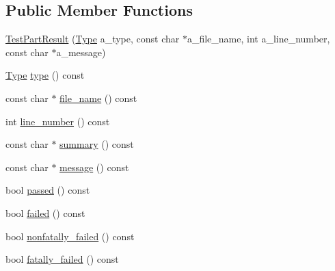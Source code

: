 \subsection*{Public Member Functions}
\begin{DoxyCompactItemize}
\item 
\hyperlink{classtesting_1_1TestPartResult_a6409eb519c1cd514aab2426c8f40737f}{Test\-Part\-Result} (\hyperlink{classtesting_1_1TestPartResult_a65ae656b33fdfdfffaf34858778a52d5}{Type} a\-\_\-type, const char $\ast$a\-\_\-file\-\_\-name, int a\-\_\-line\-\_\-number, const char $\ast$a\-\_\-message)
\item 
\hyperlink{classtesting_1_1TestPartResult_a65ae656b33fdfdfffaf34858778a52d5}{Type} \hyperlink{classtesting_1_1TestPartResult_ae852bf8693f066078c74c34345531940}{type} () const 
\item 
const char $\ast$ \hyperlink{classtesting_1_1TestPartResult_a5d8742dc28ddb880cd2391edb9fc2c9b}{file\-\_\-name} () const 
\item 
int \hyperlink{classtesting_1_1TestPartResult_a174900cf4403d23784af34f50e7b0a46}{line\-\_\-number} () const 
\item 
const char $\ast$ \hyperlink{classtesting_1_1TestPartResult_af0d4f960b453ce087c581fe13817b2a3}{summary} () const 
\item 
const char $\ast$ \hyperlink{classtesting_1_1TestPartResult_aae73962246be4d200e2c1d04246a708a}{message} () const 
\item 
bool \hyperlink{classtesting_1_1TestPartResult_a901bd62d9fbe7f39826a9d02ab2bdaec}{passed} () const 
\item 
bool \hyperlink{classtesting_1_1TestPartResult_aaf835515fb53eb1aa01c1798b05e61f6}{failed} () const 
\item 
bool \hyperlink{classtesting_1_1TestPartResult_a7bb08c87fbc1664f9fcca1504339ed29}{nonfatally\-\_\-failed} () const 
\item 
bool \hyperlink{classtesting_1_1TestPartResult_a34d31718b5fc6c06f73d03e8dbb1aa9e}{fatally\-\_\-failed} () const 
\end{DoxyCompactItemize}


